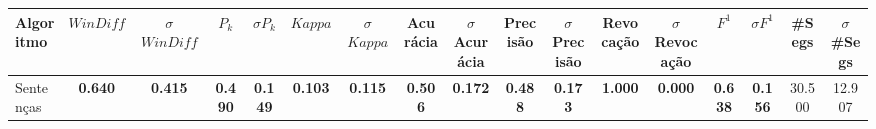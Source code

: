 \documentclass{article}
\begin{document}
\newpage
\tiny\begin{longtable}[c]{|l|c|c|c|c|c|c|c|c|c|c|c|c|c|c|c|c|} 
\hline 
Algoritmo & $WinDiff$ & $\sigma$$WinDiff$ & $P_k$ & $\sigma$$P_k$ & $Kappa$ & $\sigma$$Kappa$ & Acurácia & $\sigma$Acurácia & Precisão & $\sigma$Precisão & Revocação & $\sigma$Revocação & $F^1$ & $\sigma$$F^1$ & \#Segs & $\sigma$\#Segs\\ \hline 
Sentenças & \cellcolor{gray!20} \textbf{0.640} & \cellcolor{gray!20} \textbf{0.415} & \cellcolor{gray!20} \textbf{0.490} & \cellcolor{gray!20} \textbf{0.149} & \cellcolor{gray!20} \textbf{0.103} & \cellcolor{gray!20} \textbf{0.115} & \cellcolor{gray!20} \textbf{0.506} & \cellcolor{gray!20} \textbf{0.172} & \cellcolor{gray!20} \textbf{0.488} & \cellcolor{gray!20} \textbf{0.173} & \cellcolor{gray!20} \textbf{1.000} & \cellcolor{gray!20} \textbf{0.000} & \cellcolor{gray!20} \textbf{0.638} & \cellcolor{gray!20} \textbf{0.156} & 30.500 & 12.907  \\ \hline 
 \end{longtable} 
\newpage
\end{document}
